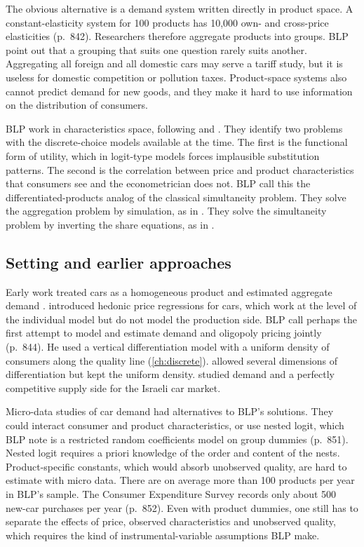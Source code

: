 The obvious alternative is a demand system written directly in product space. A constant-elasticity
system for 100 products has 10,000 own- and cross-price elasticities (p.~842). Researchers therefore
aggregate products into groups. BLP point out that a grouping that suits one question rarely suits
another. Aggregating all foreign and all domestic cars may serve a tariff study, but it is useless for
domestic competition or pollution taxes. Product-space systems also cannot predict demand for new
goods, and they make it hard to use information on the distribution of consumers.

BLP work in characteristics space, following \citet{Lancaster1971} and \citet{McFadden1974}. They
identify two problems with the discrete-choice models available at the time. The first is the
functional form of utility, which in logit-type models forces implausible substitution patterns. The
second is the correlation between price and product characteristics that consumers see and the
econometrician does not. BLP call this the differentiated-products analog of the classical
simultaneity problem. They solve the aggregation problem by simulation, as in \citet{Pakes1986}. They
solve the simultaneity problem by inverting the share equations, as in \citet{Berry1994}.

\subsection{Setting and earlier approaches}\label{sec:08-blp95-setting}

Early work treated cars as a homogeneous product and estimated aggregate demand \citep{Suits1958}.
\citet{Griliches1971} introduced hedonic price regressions for cars, which work at the level of the
individual model but do not model the production side. BLP call \citet{Bresnahan1987} perhaps the first
attempt to model and estimate demand and oligopoly pricing jointly (p.~844). He used a vertical differentiation model with a
uniform density of consumers along the quality line (\cref{ch:discrete}).
\citet{FeenstraLevinsohn1995} allowed several dimensions of differentiation but kept the uniform
density. \citet{Manski1983} studied demand and a perfectly competitive supply side for the Israeli car
market.

Micro-data studies of car demand had alternatives to BLP's solutions. They could interact consumer
and product characteristics, or use nested logit, which BLP note is a restricted random coefficients
model on group dummies (p.~851). Nested logit requires a priori knowledge of the order and content of
the nests. Product-specific constants, which would absorb unobserved quality, are hard to estimate with
micro data. There are on average more than 100 products per year in BLP's sample. The Consumer
Expenditure Survey records only about 500 new-car purchases per year (p.~852). Even with product
dummies, one still has to separate the effects of price, observed characteristics and unobserved
quality, which requires the kind of instrumental-variable assumptions BLP make.

